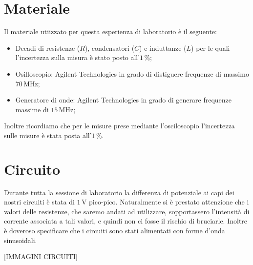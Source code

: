 \section*{Materiale}

Il materiale utiizzato per questa esperienza di laboratorio è il seguente:

\begin{itemize}
	\item{Decadi di resistenze ($R$), condensatori ($C$) e induttanze ($L$) per le quali l'incertezza sulla misura è stato posto all'$1\,\%$;}
	\item{Osilloscopio: Agilent Technologies in grado di distiguere frequenze di massimo $70\,\si{\mega\hertz}$;}
	\item{Generatore di onde: Agilent Technologies in grado di generare frequenze massime di $15\,\si{\mega\hertz}$;}
\end{itemize}

Inoltre ricordiamo che per le misure prese mediante l'osciloscopio l'incertezza sulle misure è stata posta all'$1\,\%$.

\section*{Circuito}

Durante tutta la sessione di laboratorio la differenza di potenziale ai capi dei nostri circuiti è stata di $1\,\si{\volt}$ pico-pico. Naturalmente si è prestato attenzione che i valori delle resistenze, che saremo andati ad utilizzare, sopportassero l'intensità di corrente associata a tali valori, e quindi non ci fosse il rischio di bruciarle. Inoltre è doveroso specificare che i circuiti sono stati alimentati con forme d'onda sinusoidali.

[IMMAGINI CIRCUITI]




